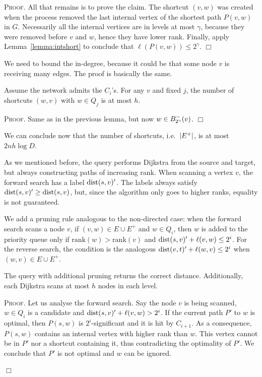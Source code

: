 \documentclass[opre,nonblindrev]{informs3} %
\renewenvironment{proof}[1][\textsc{Proof.}]{#1 }{\hfill $\Box$}
\begin{document}
\begin{APPENDICES}
\begin{proof}
	All that remains is to prove the claim.
	The shortcut $(v,w)$ was created when the process removed the last internal vertex of the shortest path $P(v,w)$ in $G$.
	Necessarily all the internal vertices are in levels at most $\gamma$, because they were removed before $v$ and $w$, hence they have lower rank.
	Finally, apply Lemma~\ref{lemma:intshort} to conclude that $\ell(P(v,w))\leq 2^\gamma$.
\end{proof}

We need to bound the in-degree, because it could be that some node $v$ is receiving many edges.
The proof is basically the same.
\begin{lemma}
	Assume the network admits the $C_i$'s.
	For any $v$ and fixed $j$, the number of shortcuts $(w,v)$ with $w\in Q_j$ is at most $h$.
\end{lemma}
\begin{proof}
	Same as in the previous lemma, but now $w\in B^-_{2^\gamma}(v)$.
\end{proof}

We can conclude now that the number of shortcuts, i.e.\ $\lvert E^+\rvert$, is at most $2nh\log D$.

As we mentioned before, the query performs Dijkstra from the source and target, but always constructing paths of increasing rank.
When scanning a vertex $v$, the forward search has a label $\mbox{dist}(s,v)'$. 
The labels always satisfy $\mbox{dist}(s,v)'\geq\mbox{dist}(s,v)$, but, since the algorithm only goes to higher ranks, equality is not guaranteed.

We add a pruning rule analogous to the non-directed case: when the forward search scans a node $v$, if $(v,w)\in E\cup E^+$ and $w\in Q_i$, then $w$ is added to the priority queue only if $\text{rank}(w)>\text{rank}(v)$ and $\mbox{dist}(s,v)'+\ell(v,w)\leq 2^i$.
For the reverse search, the condition is the analogous $\mbox{dist}(v,t)'+\ell(w,v)\leq 2^i$ when $(w,v)\in  E\cup E^+$.

\begin{proposition}
	The query with additional pruning returns the correct distance.
	Additionally, each Dijkstra scans at most $h$ nodes in each level.
\end{proposition}
\begin{proof}
	Let us analyse the forward search.
	Say the node $v$ is being scanned, $w\in Q_i$ is a candidate and $\mbox{dist}(s,v)'+\ell(v,w)>2^i$.
	If the current path $P'$ to $w$ is optimal, then $P(s,w)$ is $2^i$-significant and it is hit by $C_{i+1}$. 
	As a consequence, $P(s,w)$ contains an internal vertex with higher rank than $w$.
	This vertex cannot be in $P'$ nor a shortcut containing it, thus contradicting the optimality of $P'$.
	We conclude that $P'$ is not optimal and $w$ can be ignored.
	

\end{proof}
\end{APPENDICES}
\end{document}
